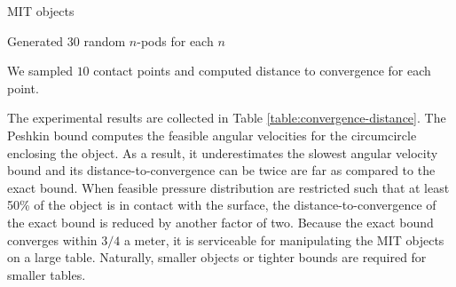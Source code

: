\documentclass[conference]{IEEEtran}
\begin{document}
\begin{inparaenum}
\item MIT objects
\item Generated 30 random $n$-pods for each $n$
\item We sampled $10$ contact points and computed distance to
  convergence for each point.
\end{inparaenum}

The experimental results are collected in Table
\ref{table:convergence-distance}. 
The Peshkin bound computes the feasible angular velocities for the
circumcircle enclosing the object. As a result, it underestimates the
slowest angular velocity bound and its distance-to-convergence can be
twice are far as compared to the exact bound.  When feasible pressure
distribution are restricted such that at least 50\% of the object is
in contact with the surface, the distance-to-convergence of the exact
bound is reduced by another factor of two. Because the exact bound
converges within $3/4$ a meter, it is serviceable for manipulating the
MIT objects on a large table. Naturally, smaller objects or tighter
bounds are required for smaller tables.
\end{document}
